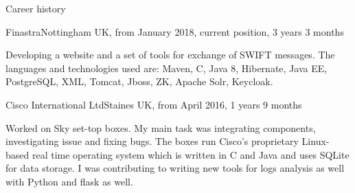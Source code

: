 \documentclass{resume}
\begin{document}
    \begin{rSection}{Career history}

        \begin{rSubsection}{Finastra}{Nottingham UK, from January 2018, current position, 3 years 3 months}{}{}
            \item[]
            Developing a website and a set of tools for exchange of SWIFT messages.
            The languages and technologies used are: Maven, C, Java 8, Hibernate, Java EE, PostgreSQL, XML, Tomcat, Jboss, ZK, Apache Solr, Keycloak.
        \end{rSubsection}


        \begin{rSubsection}{Cisco International Ltd}{Staines UK, from April 2016, 1 years 9 months}{}{}
            \item[]

            Worked on Sky set-top boxes.
            My main task was integrating components, investigating issue and fixing bugs.
            The boxes run Cisco's proprietary Linux-based real time operating system which is written in C and Java
            and uses SQLite for data storage.
            I was contributing to writing new tools for logs analysis as well with Python and flask as well.


\end{rSubsection}
\end{rSection}
\end{document}

